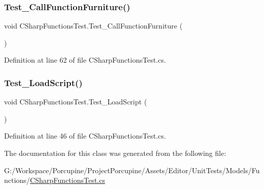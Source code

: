 \subsubsection{\texorpdfstring{Test\+\_\+\+Call\+Function\+Furniture()}{Test\_CallFunctionFurniture()}}
{\footnotesize\ttfamily void C\+Sharp\+Functions\+Test.\+Test\+\_\+\+Call\+Function\+Furniture (\begin{DoxyParamCaption}{ }\end{DoxyParamCaption})}



Definition at line 62 of file C\+Sharp\+Functions\+Test.\+cs.

\mbox{\label{class_c_sharp_functions_test_aea76f211eeeb92f51833ba0224ca4ac8}} 
\subsubsection{\texorpdfstring{Test\+\_\+\+Load\+Script()}{Test\_LoadScript()}}
{\footnotesize\ttfamily void C\+Sharp\+Functions\+Test.\+Test\+\_\+\+Load\+Script (\begin{DoxyParamCaption}{ }\end{DoxyParamCaption})}



Definition at line 46 of file C\+Sharp\+Functions\+Test.\+cs.



The documentation for this class was generated from the following file\+:\begin{DoxyCompactItemize}
\item 
G\+:/\+Workspace/\+Porcupine/\+Project\+Porcupine/\+Assets/\+Editor/\+Unit\+Tests/\+Models/\+Functions/\hyperlink{_c_sharp_functions_test_8cs}{C\+Sharp\+Functions\+Test.\+cs}\end{DoxyCompactItemize}
